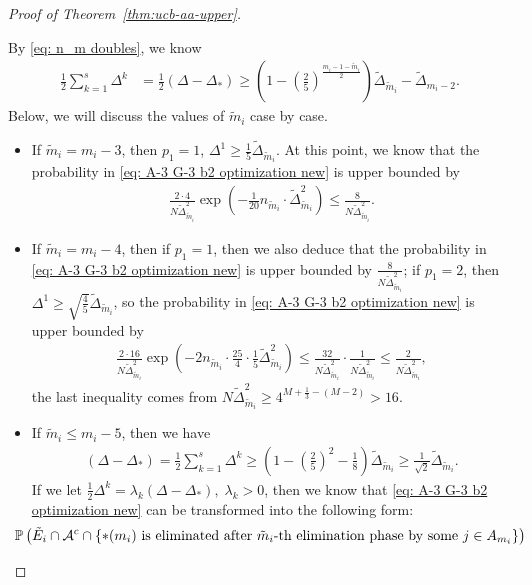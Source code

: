 \documentclass[11pt]{article}
\begin{document}
\begin{proof}[Proof of Theorem~\ref{thm:ucb-aa-upper}]
\begin{itemize}
By \eqref{eq: n_m doubles}, we know
\begin{align*}
    \frac{1}{2}\sum _{k=1}^{s}\Delta^k&=\frac{1}{2} \left(\Delta-\Delta_*\right)\geq \left(1-\left(\frac{2}{5}\right)^{\frac{m_i-1-\tilde{m}_i}{2}}\right)\tilde{\Delta}_{\tilde{m}_i}-\tilde{\Delta}_{m_i-2}.
\end{align*}
Below, we will discuss the values of $\tilde{m}_i$ case by case.
\begin{itemize}
    \item If  $\tilde{m}_i=m_i-3$, then $p_1=1$, $\Delta^1\geq \frac{1}{5}\tilde{\Delta}_{\tilde{m}_i}$. At this point, we know that the probability in \eqref{eq: A-3 G-3 b2 optimization new} is upper bounded by
    \begin{align*}
        \frac{2\cdot 4}{N\tilde{\Delta}_{\tilde{m}_i}^2}\exp\left(-\frac{1}{20}n_{\tilde{m}_i}\cdot \tilde{\Delta}_{\tilde{m}_i}^2\right)\leq \frac{8}{N\tilde{\Delta}_{\tilde{m}_i}^2}.
    \end{align*}
    \item If $\tilde{m}_i=m_i-4$, then if $p_1=1$, then we also deduce that the probability in \eqref{eq: A-3 G-3 b2 optimization new} is upper bounded by $\frac{8}{N\tilde{\Delta}_{\tilde{m}_i}^2}$; if $p_1=2$, then $\Delta^1\geq \sqrt{\frac{4}{5}}\tilde{\Delta}_{\tilde{m}_i}$, so the probability in \eqref{eq: A-3 G-3 b2 optimization new} is upper bounded by
\begin{align*}
        \frac{2\cdot 16}{N\tilde{\Delta}_{\tilde{m}_i}^2}\exp\left(-2n_{\tilde{m}_i}\cdot \frac{25}{4}\cdot \frac{1}{5}\tilde{\Delta}_{\tilde{m}_i}^2\right)\leq \frac{32}{N\tilde{\Delta}_{\tilde{m}_i}^2}\cdot \frac{1}{N\tilde{\Delta}_{\tilde{m}_i}^2}\leq \frac{2}{N\tilde{\Delta}_{\tilde{m}_i}^2},
    \end{align*}
    the last inequality comes from $ N\tilde{\Delta}_{\tilde{m}_i}^2\geq 4^{M+\frac{1}{3}-(M-2)}>16$.
\item If $\tilde{m}_i\leq m_i-5$, then we have
\begin{align*}
    (\Delta-\Delta_*)=\frac{1}{2}\sum _{k=1}^{s}\Delta^k\geq \left(1-\left(\frac{2}{5}\right)^{2}-\frac{1}{8}\right)\tilde{\Delta}_{\tilde{m}_i}\geq \frac{1}{\sqrt{2}}\tilde{\Delta}_{\tilde{m}_i}.
\end{align*}
If we let $\frac{1}{2}\Delta^k=\lambda_k(\Delta-\Delta_*),\; \lambda_k>0$, then we know that \eqref{eq: A-3 G-3 b2 optimization new} can be transformed into the following form:
 \begin{align}
&\!\!\!\!\!\!\!\!\!\!\!\!\!\!\!\!\;\;\;\;\;\mathbb{P}\left(\tilde{E}_i\cap\mathcal{A}^c\cap\left\{\text{$*(m_i)$ is eliminated after $\tilde{m}_i$-th elimination phase } \text{by some }j\in A_{m_i}\right\}\right)\notag\\

\end{align}
\end{itemize}
\end{itemize}
\end{proof}
\end{document}
